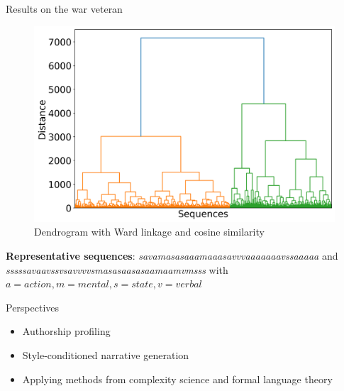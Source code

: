 \documentclass[handout,10pt]{beamer}
\begin{document}
\begin{frame}{Results on the war veteran}

\begin{figure}
    \centering
    \includegraphics[width=0.65\linewidth]{img/dendogram_viet.png}
    \caption{Dendrogram with Ward linkage and cosine similarity}%
    \label{fig:dendogram}
\end{figure}

\vspace{0.25cm}
\pause

\textbf{Representative sequences}: \textit{savamasasaaamaaasavvvaaaaaaavssaaaaa} and \textit{sssssavaavssvsavvvvsmasasaasasaamaamvmsss} with $a=action, m=mental, s=state, v=verbal$


    
\end{frame}

\begin{frame}{Perspectives}

\begin{itemize}[<+->]
    \item Authorship profiling%
    \item Style-conditioned narrative generation%
    \item Applying methods from complexity science and formal language theory%
\end{itemize}

\end{frame}
\end{document}
